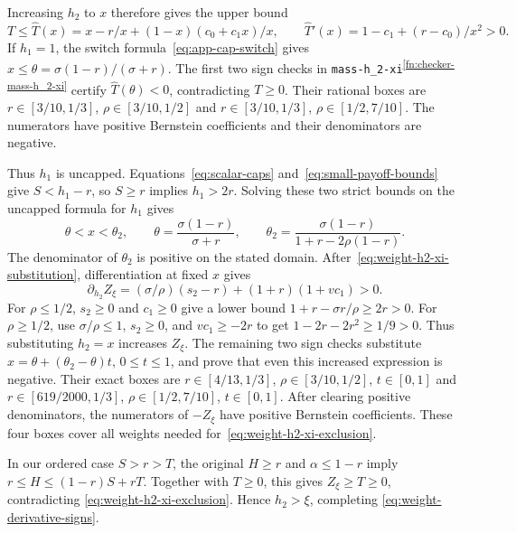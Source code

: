 \documentclass[11pt]{article}
\theoremstyle{remark}
\theoremstyle{plain}
\begin{document}
Increasing $h_2$ to $x$ therefore gives the upper bound
\begin{equation}
 T\le\widehat T(x)
     =x-r/x+(1-x)(c_0+c_1x)/x,\qquad
 \widehat T'(x)=1-c_1+(r-c_0)/x^2>0.
 \label{eq:weight-h2-xi-T}
\end{equation}
If $h_1=1$, the switch formula~\eqref{eq:app-cap-switch} gives
$x\le\theta=\sigma(1-r)/(\sigma+r)$. The first two sign checks
in \nolinkurl{mass-h_2-xi}\textsuperscript{\ref{fn:checker-mass-h_2-xi}} certify $\widehat T(\theta)<0$,
contradicting $T\ge0$. Their rational boxes are
$r\in[3/10,1/3]$, $\rho\in[3/10,1/2]$ and
$r\in[3/10,1/3]$, $\rho\in[1/2,7/10]$.
The numerators have positive Bernstein coefficients and their
denominators are negative.

Thus $h_1$ is uncapped. Equations~\eqref{eq:scalar-caps}
and~\eqref{eq:small-payoff-bounds} give
$S<h_1-r$, so $S\ge r$ implies $h_1>2r$. Solving these two
strict bounds on the uncapped formula for $h_1$ gives
\begin{equation}
 \theta<x<\theta_2,\qquad
 \theta=\frac{\sigma(1-r)}{\sigma+r},\qquad
 \theta_2=\frac{\sigma(1-r)}{1+r-2\rho(1-r)}.
 \label{eq:weight-h2-xi-range}
\end{equation}
The denominator of $\theta_2$ is positive on the stated domain.
After~\eqref{eq:weight-h2-xi-substitution}, differentiation at
fixed $x$ gives
\[
 \partial_{h_2}Z_\xi
       =(\sigma/\rho)(s_2-r)+(1+r)(1+vc_1)>0.
\]
For $\rho\le1/2$, $s_2\ge0$ and $c_1\ge0$ give a lower bound
$1+r-\sigma r/\rho\ge2r>0$. For $\rho\ge1/2$, use
$\sigma/\rho\le1$, $s_2\ge0$, and $vc_1\ge-2r$ to get
$1-2r-2r^2\ge1/9>0$. Thus substituting $h_2=x$ increases
$Z_\xi$. The remaining two sign checks substitute
$x=\theta+(\theta_2-\theta)t$, $0\le t\le1$, and prove that even
this increased expression is negative. Their exact boxes are
$r\in[4/13,1/3]$, $\rho\in[3/10,1/2]$, $t\in[0,1]$ and
$r\in[619/2000,1/3]$, $\rho\in[1/2,7/10]$, $t\in[0,1]$.
After clearing positive denominators, the numerators of $-Z_\xi$
have positive Bernstein coefficients. These four boxes cover all
weights needed for~\eqref{eq:weight-h2-xi-exclusion}.

In our ordered case $S>r>T$, the original $H\ge r$ and
$\alpha\le1-r$ imply
$r\le H\le(1-r)S+rT$. Together with $T\ge0$, this gives
$Z_\xi\ge T\ge0$, contradicting
\eqref{eq:weight-h2-xi-exclusion}. Hence $h_2>\xi$, completing
\eqref{eq:weight-derivative-signs}.
\end{document}
